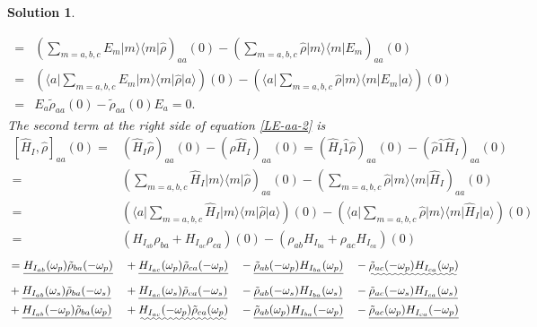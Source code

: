 \documentclass[UTF8,10pt,a4paper]{article}
\theoremstyle{Problem}
\theoremstyle{Solution}
\newtheorem*{sol}{Solution}
\begin{document}
\begin{sol}
\begin{enumerate}
\begin{align}
            \nonumber=&\left(\sum_{m=a,b,c}E_m\lvert m\rangle\langle m\rvert\hat{\rho}\right)_{aa}(0)-\left(\sum_{m=a,b,c}\hat{\rho}\lvert m\rangle\langle m\rvert E_m\right)_{aa}(0)\\
            \nonumber=&\left(\langle a\rvert\sum_{m=a,b,c}E_m\lvert m\rangle\langle m\rvert\hat{\rho}\lvert a\rangle\right)(0)-\left(\langle a\rvert\sum_{m=a,b,c}\hat{\rho}\lvert m\rangle\langle m\rvert E_m\lvert a\rangle\right)(0)\\
            =&E_a\tilde{\rho}_{aa}(0)-\tilde{\rho}_{aa}(0)E_a=0.
        \end{align}
        The second term at the right side of equation \eqref{LE-aa-2} is
        \begin{align}
            \nonumber[\hat{H}_I,\hat{\rho}]_{aa}(0)=&(\hat{H}_I\hat{\rho})_{aa}(0)-(\hat{\rho}\hat{H}_I)_{aa}(0)=(\hat{H}_I\hat{1}\hat{\rho})_{aa}(0)-(\hat{\rho}\hat{1}\hat{H}_I)_{aa}(0)\\
            \nonumber=&\left(\sum_{m=a,b,c}\hat{H}_I\lvert m\rangle\langle m\rvert\hat{\rho}\right)_{aa}(0)-\left(\sum_{m=a,b,c}\hat{\rho}\lvert m\rangle\langle m\rvert\hat{H}_I\right)_{aa}(0)\\
            \nonumber=&\left(\langle a\rvert\sum_{m=a,b,c}\hat{H}_I\lvert m\rangle\langle m\rvert\hat{\rho}\lvert a\rangle\right)(0)-\left(\langle a\rvert\sum_{m=a,b,c}\hat{\rho}\lvert m\rangle\langle m\rvert\hat{H}_I\lvert a\rangle\right)(0)\\
            \nonumber=&(H_{I_{ab}}\rho_{ba}+H_{I_{ac}}\rho_{ca})(0)-(\rho_{ab}H_{I_{ba}}+\rho_{ac}H_{I_{ca}})(0)
        \end{align}
        \begin{align}
            \nonumber&=\uline{H_{I_{ab}}(\omega_p)\tilde{\rho}_{ba}(-\omega_p)}&&+\uline{H_{I_{ac}}(\omega_p)\tilde{\rho}_{ca}(-\omega_p)}&&-\uline{\tilde{\rho}_{ab}(-\omega_p)H_{I_{ba}}(\omega_p)}&&-\uwave{\tilde{\rho}_{ac}(-\omega_p)H_{I_{ca}}(\omega_p)}\\
            \nonumber&+\uline{H_{I_{ab}}(\omega_s)\tilde{\rho}_{ba}(-\omega_s)}&&+\uline{H_{I_{ac}}(\omega_s)\tilde{\rho}_{ca}(-\omega_s)}&&-\uline{\tilde{\rho}_{ab}(-\omega_s)H_{I_{ba}}(\omega_s)}&&-\uline{\tilde{\rho}_{ac}(-\omega_s)H_{I_{ca}}(\omega_s)}\\
            \nonumber&+\uline{H_{I_{ab}}(-\omega_p)\tilde{\rho}_{ba}(\omega_p)}&&+\uwave{H_{I_{ac}}(-\omega_p)\tilde{\rho}_{ca}(\omega_p)}&&-\uline{\tilde{\rho}_{ab}(\omega_p)H_{I_{ba}}(-\omega_p)}&&-\uline{\tilde{\rho}_{ac}(\omega_p)H_{I_{ca}}(-\omega_p)}\\

\end{align}
\end{enumerate}
\end{sol}
\end{document}
